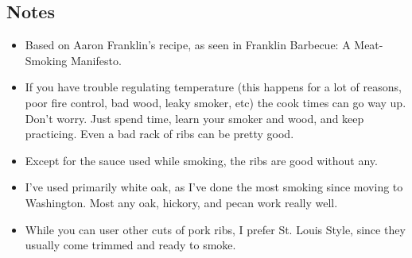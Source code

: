 \begin{multicols}{2}
\subsection*{Notes}
\begin{itemize}
    \item Based on Aaron Franklin's recipe, as seen in Franklin Barbecue: A Meat-Smoking Manifesto.
    \item If you have trouble regulating temperature (this happens for a lot of reasons, poor fire control, bad wood, leaky smoker, etc) the cook times can go way up. Don't worry. Just spend time, learn your smoker and wood, and keep practicing. Even a bad rack of ribs can be pretty good.
    \item Except for the sauce used while smoking, the ribs are good without any.
    \item I've used primarily white oak, as I've done the most smoking since moving to Washington. Most any oak, hickory, and pecan work really well.
    \item While you can user other cuts of pork ribs, I prefer St. Louis Style, since they usually come trimmed and ready to smoke.
\end{itemize}
\end{multicols}
\clearpage